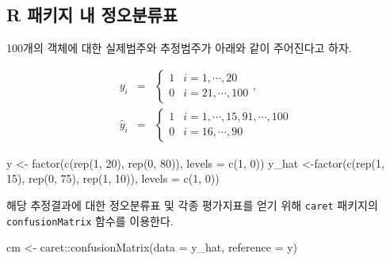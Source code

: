 \documentclass[
]{book}
\newenvironment{Shaded}{\begin{snugshade}}{\end{snugshade}}
\newcommand{\AttributeTok}[1]{\textcolor[rgb]{0.77,0.63,0.00}{#1}}
\newcommand{\DecValTok}[1]{\textcolor[rgb]{0.00,0.00,0.81}{#1}}
\newcommand{\FunctionTok}[1]{\textcolor[rgb]{0.00,0.00,0.00}{#1}}
\newcommand{\NormalTok}[1]{#1}
\newcommand{\OtherTok}[1]{\textcolor[rgb]{0.56,0.35,0.01}{#1}}
\newcommand{\SpecialCharTok}[1]{\textcolor[rgb]{0.00,0.00,0.00}{#1}}
\begin{document}
\hypertarget{confusion-matrix-r-package}{%
\subsection{R 패키지 내 정오분류표}\label{confusion-matrix-r-package}}

100개의 객체에 대한 실제범주와 추정범주가 아래와 같이 주어진다고 하자.

\begin{eqnarray*}
y_i &=& \begin{cases}
1 & i = 1, \cdots, 20\\
0 & i = 21, \cdots, 100
\end{cases},\\
\hat{y}_i &=& \begin{cases}
1 & i = 1, \cdots, 15, 91, \cdots, 100\\
0 & i = 16, \cdots, 90
\end{cases}
\end{eqnarray*}

\begin{Shaded}
\begin{Highlighting}[]
\NormalTok{y }\OtherTok{\textless{}{-}} \FunctionTok{factor}\NormalTok{(}\FunctionTok{c}\NormalTok{(}\FunctionTok{rep}\NormalTok{(}\DecValTok{1}\NormalTok{, }\DecValTok{20}\NormalTok{), }\FunctionTok{rep}\NormalTok{(}\DecValTok{0}\NormalTok{, }\DecValTok{80}\NormalTok{)), }\AttributeTok{levels =} \FunctionTok{c}\NormalTok{(}\DecValTok{1}\NormalTok{, }\DecValTok{0}\NormalTok{))}
\NormalTok{y\_hat }\OtherTok{\textless{}{-}}\FunctionTok{factor}\NormalTok{(}\FunctionTok{c}\NormalTok{(}\FunctionTok{rep}\NormalTok{(}\DecValTok{1}\NormalTok{, }\DecValTok{15}\NormalTok{), }\FunctionTok{rep}\NormalTok{(}\DecValTok{0}\NormalTok{, }\DecValTok{75}\NormalTok{), }\FunctionTok{rep}\NormalTok{(}\DecValTok{1}\NormalTok{, }\DecValTok{10}\NormalTok{)), }\AttributeTok{levels =} \FunctionTok{c}\NormalTok{(}\DecValTok{1}\NormalTok{, }\DecValTok{0}\NormalTok{))}
\end{Highlighting}
\end{Shaded}

해당 추정결과에 대한 정오분류표 및 각종 평가지표를 얻기 위해 \texttt{caret} 패키지의 \texttt{confusionMatrix} 함수를 이용한다.

\begin{Shaded}
\begin{Highlighting}[]
\NormalTok{cm }\OtherTok{\textless{}{-}}\NormalTok{ caret}\SpecialCharTok{::}\FunctionTok{confusionMatrix}\NormalTok{(}\AttributeTok{data =}\NormalTok{ y\_hat, }\AttributeTok{reference =}\NormalTok{ y)}
\end{Highlighting}
\end{Shaded}
\end{document}
